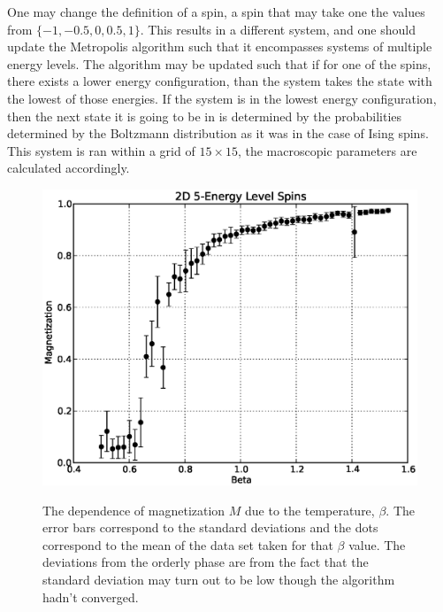 One may change the definition of a spin, a spin that may take one the values from $ \lbrace -1,-0.5,0,0.5,1\rbrace  $. This results in a different system, and one should update the Metropolis algorithm such that it encompasses systems of multiple energy levels. The algorithm may be updated such that if for one of the spins, there exists a lower energy configuration, than the system takes the state with the lowest of those energies. If the system is in the lowest energy configuration,  then the next state it is going to be in is determined by the probabilities determined by the Boltzmann distribution as it was in the case of Ising spins. This system is ran within a grid of $ 15 \times 15 $, the macroscopic parameters are calculated accordingly. 


\begin{figure}[H]
\center
\includegraphics[width=\linewidth]{fig/15/plot.eps}
\label{fig:225spins}
\caption[The dependence of magnetization $ M $ due to the temperature, $ \beta $ in 5-level spins.]{The dependence of magnetization $ M $ due to the temperature, $ \beta $. The error bars correspond to the standard deviations and the dots correspond to the mean of the data set taken for that $ \beta $ value. The deviations from the orderly phase are from the fact that the standard deviation may turn out to be low though the algorithm hadn't converged.}
\end{figure}

